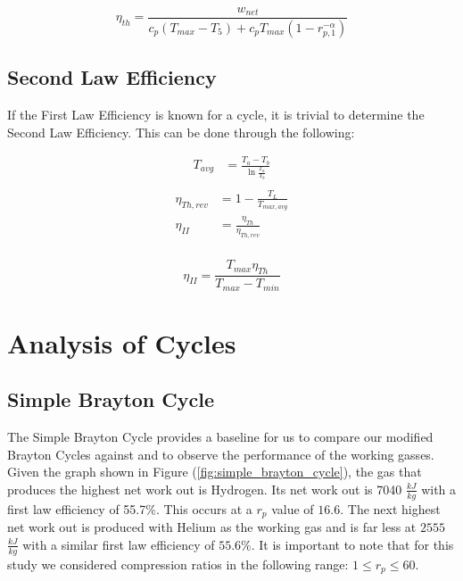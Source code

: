 \documentclass[
	12pt, %
]{brayton_cycle_report_style}
\begin{document}
\begin{equation}
    \eta_{th}=\frac{w_{net}}{c_p(T_{max}-T_5)+c_pT_{max}(1-r_{p,1}^{-\alpha})}
\end{equation}

\subsection{Second Law Efficiency}

If the First Law Efficiency is known for a cycle, it is trivial to determine the Second Law Efficiency. This can be done through the following:

\begin{multicols}{2}
  \begin{align*}
    T_{avg} &=\frac{T_a-T_b}{\ln{\frac{T_a}{T_b}}} \\
  \end{align*}
  \begin{align*}
    \eta_{Th,rev} &= 1 - \frac{T_L}{T_{max,avg}}\\
    \eta_{II} &= \frac{\eta_{Th}}{\eta_{Th, rev}} \\
  \end{align*}
\end{multicols}
\vspace{-15mm}
\begin{equation}
    \eta_{II}=\frac{T_{max}\eta_{Th}}{T_{max}-T_{min}}
\end{equation}


\section{Analysis of Cycles}

\subsection{Simple Brayton Cycle}

The Simple Brayton Cycle provides a baseline for us to compare our modified Brayton Cycles against and to observe the performance of the working gasses. Given the graph shown in Figure (\ref{fig:simple_brayton_cycle}), the gas that produces the highest net work out is Hydrogen. Its net work out is  7040 $\frac{kJ}{kg}$ with a first law efficiency of 55.7\%. This occurs at a $r_{p}$ value of $16.6$. The next highest net work out is produced with Helium as the working gas and is far less at $2555$ $\frac{kJ}{kg}$ with a similar first law efficiency of $55.6\%$. It is important to note that for this study we considered compression ratios in the following range: $1 \leq r_p \leq 60$.
\end{document}
